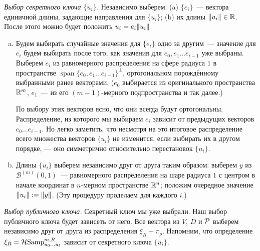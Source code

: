 \documentclass[oneside, a4paper]{article}
\theoremstyle{plain}
\theoremstyle{definition}
\theoremstyle{remark}
\DeclareMathOperator{\Span}{span}
\newcommand\PP{\ensuremath \mathcal P}
\newcommand\R{\ensuremath \mathbb R}
\newcommand\HS{\ensuremath \operatorname{\mathcal H Samp}}
\DeclarePairedDelimiter\norm{\lVert}{\rVert}
\begin{document}
\emph{Выбор секретного ключа $\{u_i\}$.} Независимо выберем: (a) $\{e_i\}$~--- вектора единичной длины, задающие
направления для $\{u_i\}$; (b) их длины $\norm{u_i} \in \R$. После этого можно будет положить $u_i = e_i \norm{u_i}$.
\begin{enumerate}[(a)]
\item Будем выбирать случайные значения для $\{e_i\}$ одно за другим~--- значение для $e_i$ будем выбирать после того,
как значения для $e_0, e_1 \dots e_{i-1}$ уже выбраны. Выберем $e_i$ из равномерного распределения на сфере радиуса $1$
в пространстве $\Span \{e_0, e_1 \dots e_{i-1}\}^\bot$, ортогональном порождённому выбранными ранее векторами. ($e_0$
выбирается из оригинального пространства $\R^m$, $e_1$~--- из его $(m-1)$-мерного подпространства и так далее.)

По выбору этих векторов ясно, что они всегда будут ортогональны. Распределение, из которого мы выбираем $e_i$ зависит от
предыдущих векторов $e_0 \dots e_{i-1}$. Но легко заметить, что несмотря на это итоговое распределение всего множества
векторов $\{u_i\}$ не изменится, если выбирать их в другом порядке, --- оно симметрично относительно перестановок
$\{u_i\}$.

\item Длины $\{u_i\}$ выберем независимо друг от друга таким образом: выберем $y$ из $\mathcal B^{(m)}(0,1)$~---
равномерного распределения на шаре радиуса $1$ с центром в начале координат в $n$-мерном пространстве $\R^n$; положим
очередное значение $\norm{u_i} := \norm{y}$. (Эту процедуру проделаем для каждого $i$.)
\end{enumerate}

\emph{Выбор публичного ключа.} Секретный ключ мы уже выбрали. Наш выбор публичного ключа будет зависеть от него.  
Все вектора из $V$, $D$ и $\PP$ выберем независимо друг от друга из распределения $\xi_R + \pi_\rho$. Напомним, что
определение $\xi_R = \HS^{m, R}_{u_0 \dots u_l}$ зависит от секретного ключа $\{u_i\}$.
\end{document}

